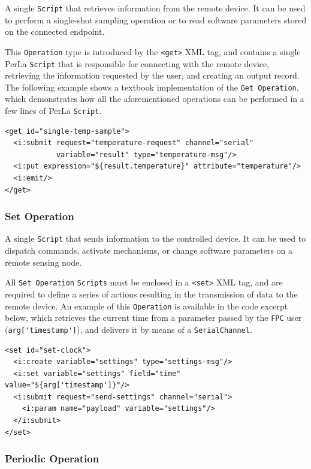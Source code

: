 A single \texttt{Script} that retrieves information from the remote device. It
can be used to perform a single-shot sampling operation or to read software
parameters stored on the connected endpoint.

This \texttt{Operation} type is introduced by the \lstinline!<get>! XML tag,
and contains a single PerLa \texttt{Script} that is responsible for connecting
with the remote device, retrieving the information requested by the user, and
creating an output record. The following example shows a textbook
implementation of the \texttt{Get Operation}, which demonstrates how all the
aforementioned operations can be performed in a few lines of PerLa
\texttt{Script}.

\lstset{language=XML}
\begin{lstlisting}
<get id="single-temp-sample">
  <i:submit request="temperature-request" channel="serial"
            variable="result" type="temperature-msg"/>
  <i:put expression="${result.temperature}" attribute="temperature"/>
  <i:emit/>
</get>
\end{lstlisting}

\subsubsection{Set Operation}

A single \texttt{Script} that sends information to the controlled device. It
can be used to dispatch commands, activate mechanisms, or change software
parameters on a remote sensing node.

All \texttt{Set Operation} \texttt{Scripts} must be enclosed in a
\lstinline!<set>! XML tag, and are required to define a series of actions
resulting in the transmission of data to the remote device. An example of this
\texttt{Operation} is available in the code excerpt below, which retrieves the
current time from a parameter passed by the \texttt{FPC} user
(\lstinline!arg['timestamp']!), and delivers it by means of a
\texttt{SerialChannel}.

\lstset{language=XML}
\begin{lstlisting}
<set id="set-clock">
  <i:create variable="settings" type="settings-msg"/>
  <i:set variable="settings" field="time" value="${arg['timestamp']}"/>
  <i:submit request="send-settings" channel="serial">
    <i:param name="payload" variable="settings"/>
  </i:submit>
</set>
\end{lstlisting}

\subsubsection{Periodic Operation}

